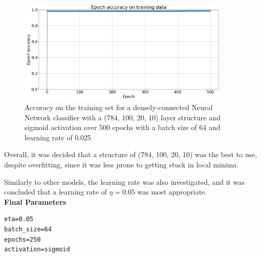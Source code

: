 \documentclass[11pt,a4paper]{article}
\begin{document}
\begin{figure}[H]
    \centering
    \includegraphics[width=0.9\textwidth]{img/nn_784_100_20_10_overfit_eta_0025.png}
    \caption{Accuracy on the training set for a densely-connected Neural Network classifier with a (784, 100, 20, 10) layer structure and sigmoid activation over 500 epochs with a batch size of 64 and learning rate of 0.025}
    \label{fig:nn_784_100_20_10_overfit}
\end{figure}

\noindent Overall, it was decided that a structure of (784, 100, 20, 10) was the best to use, despite overfitting, since it was less prone to getting stuck in local minima.

\noindent Similarly to other models, the learning rate was also investigated, and it was concluded that a learning rate of $\eta=0.05$ was most appropriate.\\

\noindent \textbf{Final Parameters}
\begin{verbatim}
eta=0.05
batch_size=64
epochs=250
activation=sigmoid
\end{verbatim}

\pagebreak
\end{document}

